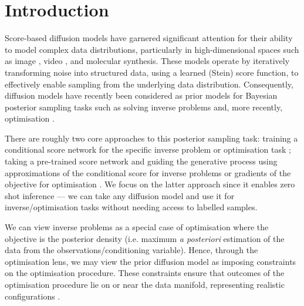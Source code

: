 \chapter{Introduction}

Score-based diffusion models
\parencite{pmlr-v37-sohl-dickstein15,hoDenoisingDiffusionProbabilistic2020,songGenerativeModelingEstimating2020}
have garnered significant attention for their ability to model complex data distributions,
particularly in high-dimensional spaces such as image
\parencite{dhariwalDiffusionModelsBeat2021,rombachHighResolutionImageSynthesis2021},
video \parencite{hoVideoDiffusionModels2022}, and molecular
\parencite{xuGeoDiffGeometricDiffusion2022} synthesis. These models operate by iteratively
transforming noise into structured data, using a learned (Stein) score function, to effectively enable
sampling from the underlying data distribution. Consequently, diffusion models have recently been
considered as prior models for Bayesian posterior sampling tasks such as solving inverse problems
\parencite{songGenerativeModelingEstimating2020} and, more recently, optimisation
\parencite{krishnamoorthyDiffusionModelsBlackBox2023,guoGradientGuidanceDiffusion2024,kongDiffusionModelsConstrained2024}.

There are roughly two core approaches to this posterior sampling task: training a conditional score
network for the specific inverse problem
\parencite{songGenerativeModelingEstimating2020,nicholGLIDEPhotorealisticImage2021, sahariaPaletteImagetoImageDiffusion2021,sahariaPhotorealisticTexttoImageDiffusion2022}
or optimisation task \parencite{krishnamoorthyDiffusionModelsBlackBox2023,guoGradientGuidanceDiffusion2024};
taking a pre-trained score network and guiding the generative process using approximations of the
conditional score for inverse problems
\parencite{chungDiffusionPosteriorSampling2022,song2023pseudoinverseguided,boysTweedieMomentProjected2023}
or gradients of the objective for optimisation \parencite{kongDiffusionModelsConstrained2024}. We
focus on the latter approach since it enables zero shot inference --- we can take any diffusion
model and use it for inverse/optimisation tasks without needing access to labelled samples.

We can view inverse problems as a special case of optimisation where the objective is the posterior
density (i.e. maximum \emph{a posteriori} estimation of the data from the
observations/conditioning variable). Hence, through the optimisation lens, we may view the prior
diffusion model as imposing constraints on the optimisation procedure. These constraints ensure
that outcomes of the optimisation procedure lie on or near the data manifold, representing
realistic configurations \parencite{kongDiffusionModelsConstrained2024}.

